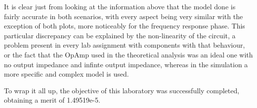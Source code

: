 \par It is clear just from looking at the information above that the model done is fairly accurate in both scenarios, with every aspect being very similar with the exception of both plots, more noticeably for the frequency response phase. This particular discrepancy can be explained by the non-linearity of the circuit, a problem present in every lab assignment with components with that behaviour, or the fact that the OpAmp used in the theoretical analysis was an ideal one with no output impedance and infinte output impedance, whereas in the simulation a more specific and complex model is used.
\par To wrap it all up, the objective of this laboratory was successfully completed, obtaining a merit of 1.49519e-5.


















